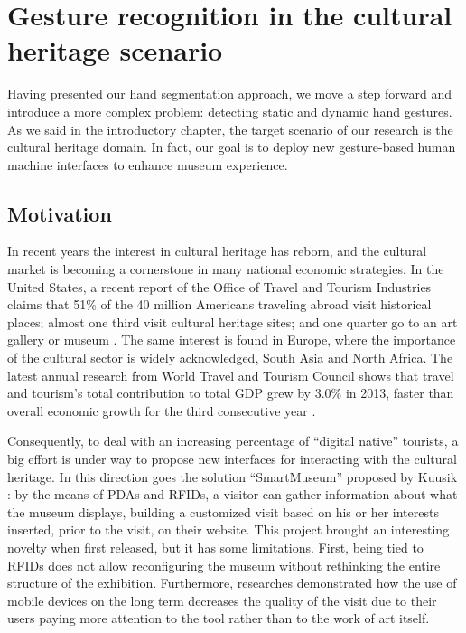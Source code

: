 
\chapter{Gesture recognition in the cultural heritage scenario}


Having presented our hand segmentation approach, we move a step forward and introduce a more complex problem: detecting static and dynamic hand gestures. As we said in the introductory chapter, the target scenario of our research is the cultural heritage domain. In fact, our goal is to deploy new gesture-based human machine interfaces to enhance museum experience.

\section{Motivation}
In recent years the interest in cultural heritage has reborn, and the cultural market is becoming a cornerstone in many national economic strategies. In the United States, a recent report of the Office of Travel and Tourism Industries claims that 51\% of the 40 million Americans traveling abroad visit historical places; almost one third visit cultural heritage sites; and one quarter go to an art gallery or museum \cite{tourismintelligence}. The same interest is found in Europe, where the importance of the cultural sector is widely acknowledged, South Asia and North Africa. The latest annual research from World Travel and Tourism Council shows that travel and tourism's total contribution to total GDP grew by 3.0\% in 2013, faster than overall economic growth for the third consecutive year \cite{econotravel}.

Consequently, to deal with an increasing percentage of ``digital native'' tourists, a big effort is under way to propose new interfaces for interacting with the cultural heritage.
 In this direction goes the solution ``SmartMuseum'' proposed by Kuusik \etal \cite{kuusik2009smartmuseum}: by the means of PDAs and RFIDs, a visitor can gather information about what the museum displays, building a customized visit based on his or her interests inserted, prior to the visit, on their website. This project brought an interesting novelty when first released, but it has some limitations. First, being tied to RFIDs does not allow reconfiguring the museum without rethinking the entire structure of the exhibition. Furthermore, researches demonstrated how the use of mobile devices on the long term decreases the quality of the visit due to their users paying more attention to the tool rather than to the work of art itself.

